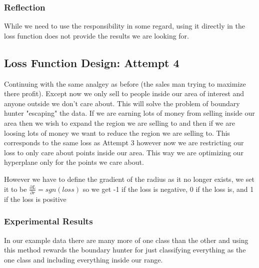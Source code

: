 \documentclass{article}
\begin{document}
\subsubsection{Reflection}
While we need to use the responsibility in some regard, using it directly in the loss function does not provide the results we are looking for.


\subsection{Loss Function Design: Attempt 4}
Continuing with the same analgey as before (the sales man trying to maximize there profit). Except now we only sell to people inside our area of interest and anyone outside we don't care about. This will solve the problem of boundary hunter "escaping" the data. If we are earning lots of money from selling inside our area then we wish to expand the region we are selling to and then if we are loosing lots of money we want to reduce the region we are selling to. This corresponds to the same loss as Attempt 3 however now we are restricting our loss to only care about points inside our area. This way we are optimizing our hyperplane only for the points we care about.

However we have to define the gradient of the radius as it no longer exists, we set it to be $\frac{\partial L}{\partial r} = sgn(loss)$  so we get -1 if the loss is negative, 0 if the loss is, and 1 if the loss is positive

\subsubsection{Experimental Results}
In our example data there are many more of one class than the other and using this method rewards the boundary hunter for just classifying everything as the one class and including everything inside our range.
\end{document}
